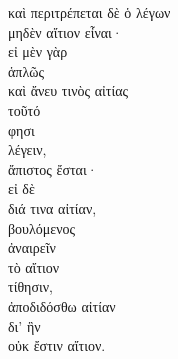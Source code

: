 {\large
\begin{greek}
\noindent  καὶ περιτρέπεται δὲ ὁ λέγων \\
\tabto{2em} μηδὲν αἴτιον εἶναι· \\
\tabto{4em} εἰ μὲν γὰρ \\
\tabto{6em} ἁπλῶς \\
\tabto{6em} καὶ ἄνευ τινὸς αἰτίας \\
\tabto{6em} τοῦτό \\
\tabto{4em} φησι \\
\tabto{6em} λέγειν, \\
\tabto{4em} ἄπιστος ἔσται· \\
\tabto{4em} εἰ δὲ \\
\tabto{6em} διά τινα αἰτίαν, \\
\tabto{4em} βουλόμενος \\
\tabto{6em} ἀναιρεῖν \\
\tabto{6em} τὸ αἴτιον \\
\tabto{4em} τίθησιν, \\
\tabto{4em} ἀποδιδόσθω αἰτίαν \\
\tabto{6em} δι’ ἣν \\
\tabto{8em} οὐκ ἔστιν αἴτιον.\\

\end{greek}
}

